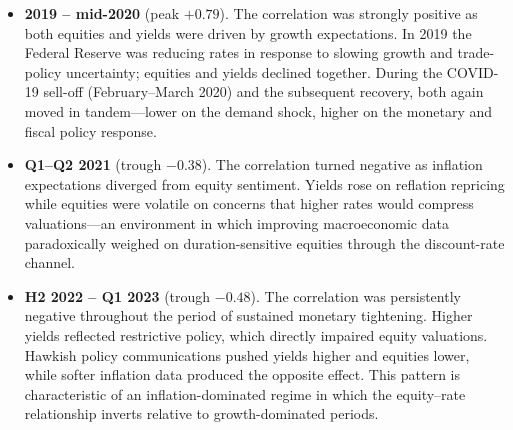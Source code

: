 \begin{itemize}
  \item \textbf{2019 -- mid-2020} (peak \(+0.79\)). The correlation was
    strongly positive as both equities and yields were driven by growth
    expectations. In 2019 the Federal Reserve was reducing rates in response
    to slowing growth and trade-policy uncertainty; equities and yields
    declined together. During the COVID-19 sell-off (February--March 2020) and
    the subsequent recovery, both again moved in tandem---lower on the demand
    shock, higher on the monetary and fiscal policy response.

  \item \textbf{Q1--Q2 2021} (trough \(-0.38\)). The correlation turned
    negative as inflation expectations diverged from equity sentiment. Yields
    rose on reflation repricing while equities were volatile on concerns that
    higher rates would compress valuations---an environment in which
    improving macroeconomic data paradoxically weighed on duration-sensitive
    equities through the discount-rate channel.

  \item \textbf{H2 2022 -- Q1 2023} (trough \(-0.48\)). The correlation was
    persistently negative throughout the period of sustained monetary
    tightening. Higher yields reflected restrictive policy, which directly
    impaired equity valuations. Hawkish policy communications pushed yields
    higher and equities lower, while softer inflation data produced the
    opposite effect. This pattern is characteristic of an inflation-dominated
    regime in which the equity--rate relationship inverts relative to
    growth-dominated periods.
\end{itemize}
